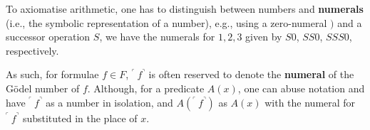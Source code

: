 To axiomatise arithmetic, one has to distinguish between numbers and \textbf{numerals} (i.e., the symbolic representation of a number), e.g., using a zero-numeral $)$ and a successor operation $S$, we have the numerals for $1,2,3$ given by $S0$, $SS0$, $SSS0$, respectively.

As such, for formulae $f \in F$, ${}^\ulcorner\ f {}^\urcorner$ is often reserved to denote the \textbf{numeral} of the Gödel number of $f$. Although, for a predicate $A(x)$, one can abuse notation and have ${}^\ulcorner\ f {}^\urcorner$ as a number in isolation, and $A({}^\ulcorner\ f {}^\urcorner)$ as $A(x)$ with the numeral for ${}^\ulcorner\ f {}^\urcorner$ substituted in the place of $x$.